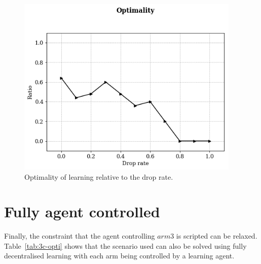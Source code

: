 \begin{figure}[ht]
\centering
\begin{minipage}[t]{.5\textwidth}
    \centering
    \includegraphics[width=0.95\textwidth]{imgs/exp-3-2msg-optimality.png}
    \caption[Optimality relative to the drop rate]{Optimality of learning relative to the drop rate.}
    \label{fig:exp-3-behaviour}
\end{minipage}%
\end{figure}



\section{Fully agent controlled}

Finally, the constraint that the agent controlling $arm3$ is scripted can be relaxed. Table~\ref{tab:3c-opti} shows that the scenario used can also be solved using fully decentralised learning with each arm being controlled by a learning agent. 

